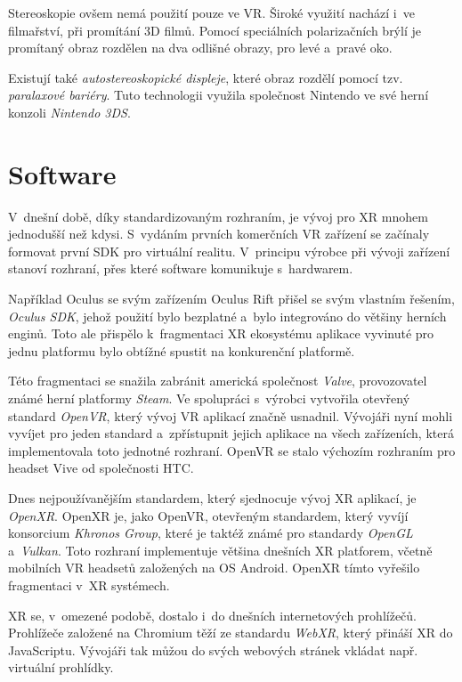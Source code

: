 Stereoskopie ovšem nemá použití pouze ve VR. Široké využití nachází i~ve filmařství, při promítání 3D filmů. Pomocí speciálních polarizačních brýlí je promítaný obraz rozdělen na dva odlišné obrazy, pro levé a~pravé oko. \cite{unitedfilm_stereoskopie}

Existují také \textit{autostereoskopické displeje}, které obraz rozdělí pomocí tzv. \textit{paralaxové bariéry}. Tuto technologii využila společnost Nintendo ve své herní konzoli \textit{Nintendo 3DS}. \cite{enwiki:1158939127}

\chapter{Software}

V~dnešní době, díky standardizovaným rozhraním, je vývoj pro XR mnohem jednodušší než kdysi. S~vydáním prvních komerčních VR zařízení se začínaly formovat první \gls{SDK} pro virtuální realitu. V~principu výrobce při vývoji zařízení stanoví rozhraní, přes které software komunikuje s~hardwarem. 

Například Oculus se svým zařízením Oculus Rift přišel se svým vlastním řešením, \textit{Oculus SDK}, jehož použití bylo bezplatné a~bylo integrováno do většiny herních enginů. \cite{enwiki:1193283032} Toto ale přispělo k~fragmentaci XR ekosystému \poml aplikace vyvinuté pro jednu platformu bylo obtížné spustit na konkurenční platformě.

Této fragmentaci se snažila zabránit americká společnost \textit{Valve}, provozovatel známé herní platformy \textit{Steam}. Ve spolupráci s~výrobci vytvořila otevřený standard \textit{OpenVR}, který vývoj VR aplikací značně usnadnil. Vývojáři nyní mohli vyvíjet pro jeden standard a~zpřístupnit jejich aplikace na všech zařízeních, která implementovala toto jednotné rozhraní. OpenVR se stalo výchozím rozhraním pro headset Vive od společnosti HTC. \cite{enwiki:1192992480}

Dnes nejpoužívanějším standardem, který sjednocuje vývoj XR aplikací, je \textit{OpenXR}. OpenXR je, jako OpenVR, otevřeným standardem, který vyvíjí konsorcium \textit{Khronos Group}, které je taktéž známé pro standardy \textit{OpenGL} a~\textit{Vulkan}. Toto rozhraní implementuje většina dnešních XR platforem, včetně mobilních VR headsetů založených na OS Android. OpenXR tímto vyřešilo fragmentaci v~XR systémech. \cite{enwiki:1186405367}

XR se, v~omezené podobě, dostalo i~do dnešních internetových prohlížečů. Prohlížeče založené na Chromium těží ze standardu \textit{WebXR}, který přináší XR do JavaScriptu. Vývojáři tak můžou do svých webových stránek vkládat např. virtuální prohlídky. \cite{webxr_mdn}

